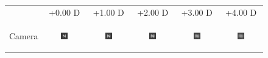 
\begin{figure}[!th]
	\centering
	
	\begin{tabular}{@{}r@{ } c@{ } c@{ } c@{ } c@{ } c }
	&
	\small{+0.00 D} &
	\small{+1.00 D} &
	\small{+2.00 D} &
	\small{+3.00 D} &
	\small{+4.00 D} & \\

	\begin{sideways} \parbox[b]{20mm} {Camera} \end{sideways} &
	\includegraphics[width=0.185\textwidth]{../../__Images/05/BW_N(20-200)_+0D_to_+4D/bw_N_20-200_Camera+0,00D(lens).png} &
	\includegraphics[width=0.185\textwidth]{../../__Images/05/BW_N(20-200)_+0D_to_+4D/bw_N_20-200_Camera+1,00D(lens).png} &
	\includegraphics[width=0.185\textwidth]{../../__Images/05/BW_N(20-200)_+0D_to_+4D/bw_N_20-200_Camera+2,00D(lens).png} &
	\includegraphics[width=0.185\textwidth]{../../__Images/05/BW_N(20-200)_+0D_to_+4D/bw_N_20-200_Camera+3,00D(lens).png} &
	\includegraphics[width=0.185\textwidth]{../../__Images/05/BW_N(20-200)_+0D_to_+4D/bw_N_20-200_Camera+4,00D(lens).png} \\


\end{tabular}
\end{figure}
